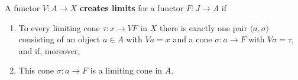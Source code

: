 A functor $V: A \rightarrow X$ \textbf{creates limits} for a functor $F: J \rightarrow A$ if

\begin{enumerate}
\item[(i)] To every limiting cone $\tau: x \rightarrow VF$ in $X$ there is exactly one pair $\langle a, \sigma \rangle$ consisting of an object $a \in A$ with $Va = x$ and a cone $\sigma: a \rightarrow F$ with $V\sigma = \tau$, and if, moreover,
\item[(ii)] This cone $\sigma: a \rightarrow F$ is a limiting cone in $A$.
\end{enumerate}
